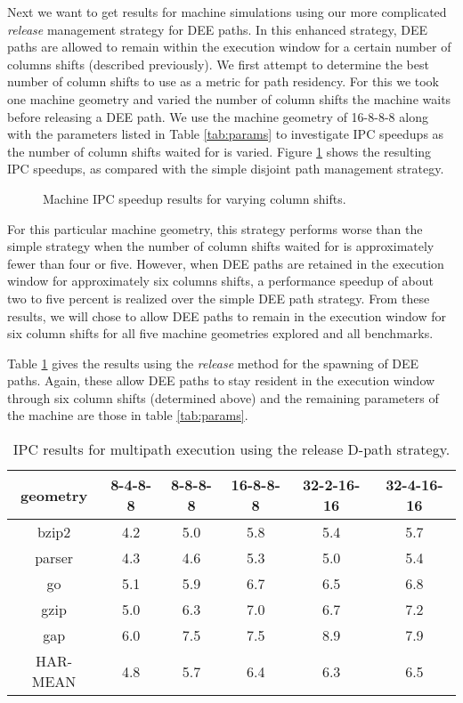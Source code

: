 \documentclass[10pt,dvips]{article}
\begin{document}
Next we want to get results for machine simulations using our
more complicated \textit{release} management strategy for DEE paths.
In this enhanced strategy, DEE paths are allowed to
remain within the execution window for a certain number of
columns shifts (described previously).  We first attempt to
determine the best number of column shifts to use as a metric
for path residency.  For this we took one machine geometry and
varied the number of column shifts the machine waits before releasing
a DEE path.
We use the machine geometry of 16-8-8-8 along with the parameters
listed in Table \ref{tab:params}
to investigate
IPC speedups as the number of column shifts waited for is varied.
Figure \ref{fig:release} shows the resulting IPC speedups,
as compared with the simple disjoint path management strategy.
%
\begin{figure}
\centering
{}
\caption{Machine IPC speedup results for varying 
column shifts.}
\label{fig:release}
\end{figure}
%
For this particular machine geometry, this strategy
performs worse than the simple strategy when the number
of column shifts waited for is 
approximately fewer than four or five.
However, when DEE paths are retained in the
execution window for approximately
six columns shifts,
a performance speedup of about two to five percent is realized
over the simple DEE path strategy.
From these results, we will chose to allow DEE paths
to remain in the execution window for six column shifts
for all five machine geometries explored and all benchmarks.

Table \ref{tab:ipc3} gives the results using the \textit{release} 
method for the spawning of DEE paths.
Again, these allow DEE paths
to stay resident in the execution window through six column shifts
(determined above)
and the remaining parameters of the machine 
are those in table \ref{tab:params}.
%
\begin{table}
\begin{center}
\caption{IPC results for multipath execution using the 
release D-path strategy.}
\label{tab:ipc3}
\begin{tabular}{|c|c|c|c|c|c|}
\hline 
geometry&
8-4-8-8&
8-8-8-8&
16-8-8-8&
32-2-16-16&
32-4-16-16\\
\hline 
\hline
bzip2&4.2&5.0&5.8&5.4&5.7\\
\hline 
parser&4.3&4.6&5.3&5.0&5.4\\
\hline 
go&5.1&5.9&6.7&6.5&6.8\\
\hline 
gzip&5.0&6.3&7.0&6.7&7.2\\
\hline 
gap&6.0&7.5&7.5&8.9&7.9\\
\hline 
\hline 
HAR-MEAN&4.8&5.7&6.4&6.3&6.5\\
\hline
\end{tabular}
\end{center}
\end{table}
\end{document}
